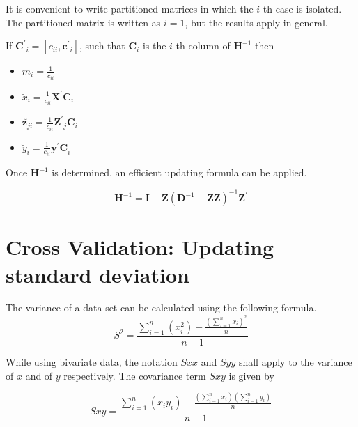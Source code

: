 \documentclass[MAIN.tex]{subfiles}
\begin{document}
	It is convenient to write partitioned matrices in which the $i$-th case is isolated. The partitioned matrix is written as $ i = 1$, but the results apply in general.
	
	If $\boldsymbol{C^{\prime}}_{i}  = [c_{ii}, \boldsymbol{c^{\prime}}_{i}]$, such that  $\boldsymbol{C}_{i}$ is the
	$i$-th column of $\boldsymbol{H}^{-1}$ then
	
	
	\begin{itemize}
		\item $m_{i} = \frac{1}{c_{ii}}$\\
		\item $\breve{x}_{i} = \frac{1}{c_{ii}}\boldsymbol{X^{\prime}C}_{i}$\\
		\item $\breve{\boldsymbol{z}_{ji}} = \frac{1}{c_{ii}}\boldsymbol{Z^{\prime}}_{j}\boldsymbol{C}_{i}$\\
		\item $\breve{y}_{i} = \frac{1}{c_{ii}}\boldsymbol{y^{\prime}C}_{i}$\\
	\end{itemize}
	
	Once $\boldsymbol{H}^{-1}$ is determined, an efficient updating formula can be applied.
	
	
	
	\begin{equation}
	\boldsymbol{H}^{-1} = \boldsymbol{I} - \boldsymbol{Z}(\boldsymbol{D}^{-1} + \boldsymbol{ZZ})^{-1}\boldsymbol{Z^{\prime}}
	\end{equation}
	
	
	
	
	
\section{Cross Validation: Updating standard deviation} %

The variance of a data set can be calculated using the following formula.
\begin{equation}
S^{2}=\frac{\sum_{i=1}^{n}(x_{i}^{2})-\frac{(\sum_{i=1}^{n}x_{i})^{2}}{n}}{n-1}
\end{equation}

While using bivariate data, the notation $Sxx$ and $Syy$ shall apply to the variance of $x$ and of $y$ respectively. The covariance term $Sxy$ is given by

\begin{equation}
Sxy=\frac{\sum_{i=1}^{n}(x_{i}y_{i})-\frac{(\sum_{i=1}^{n}x_{i})(\sum_{i=1}^{n}y_{i})}{n}}{n-1}
\end{equation}
\end{document}
